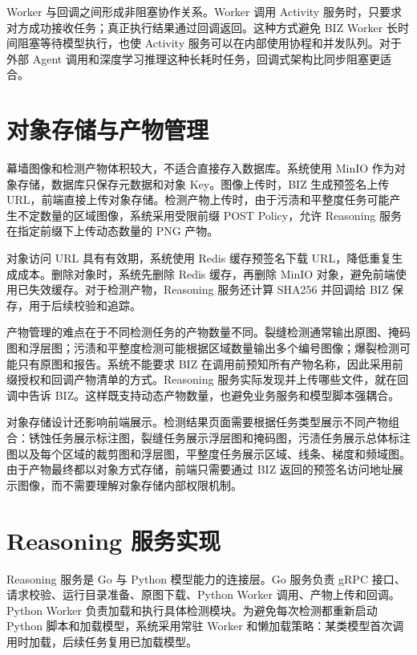 Worker 与回调之间形成非阻塞协作关系。Worker 调用 Activity 服务时，只要求对方成功接收任务；真正执行结果通过回调返回。这种方式避免 BIZ Worker 长时间阻塞等待模型执行，也使 Activity 服务可以在内部使用协程和并发队列。对于外部 Agent 调用和深度学习推理这种长耗时任务，回调式架构比同步阻塞更适合。

\section{对象存储与产物管理}
\label{sec:impl-object-storage}

幕墙图像和检测产物体积较大，不适合直接存入数据库。系统使用 MinIO 作为对象存储，数据库只保存元数据和对象 Key。图像上传时，BIZ 生成预签名上传 URL，前端直接上传对象存储。检测产物上传时，由于污渍和平整度任务可能产生不定数量的区域图像，系统采用受限前缀 POST Policy，允许 Reasoning 服务在指定前缀下上传动态数量的 PNG 产物。

对象访问 URL 具有有效期，系统使用 Redis 缓存预签名下载 URL，降低重复生成成本。删除对象时，系统先删除 Redis 缓存，再删除 MinIO 对象，避免前端使用已失效缓存。对于检测产物，Reasoning 服务还计算 SHA256 并回调给 BIZ 保存，用于后续校验和追踪。

产物管理的难点在于不同检测任务的产物数量不同。裂缝检测通常输出原图、掩码图和浮层图；污渍和平整度检测可能根据区域数量输出多个编号图像；爆裂检测可能只有原图和报告。系统不能要求 BIZ 在调用前预知所有产物名称，因此采用前缀授权和回调产物清单的方式。Reasoning 服务实际发现并上传哪些文件，就在回调中告诉 BIZ。这样既支持动态产物数量，也避免业务服务和模型脚本强耦合。

对象存储设计还影响前端展示。检测结果页面需要根据任务类型展示不同产物组合：锈蚀任务展示标注图，裂缝任务展示浮层图和掩码图，污渍任务展示总体标注图以及每个区域的裁剪图和浮层图，平整度任务展示区域、线条、梯度和频域图。由于产物最终都以对象方式存储，前端只需要通过 BIZ 返回的预签名访问地址展示图像，而不需要理解对象存储内部权限机制。

\section{Reasoning 服务实现}
\label{sec:impl-reasoning}

Reasoning 服务是 Go 与 Python 模型能力的连接层。Go 服务负责 gRPC 接口、请求校验、运行目录准备、原图下载、Python Worker 调用、产物上传和回调。Python Worker 负责加载和执行具体检测模块。为避免每次检测都重新启动 Python 脚本和加载模型，系统采用常驻 Worker 和懒加载策略：某类模型首次调用时加载，后续任务复用已加载模型。


